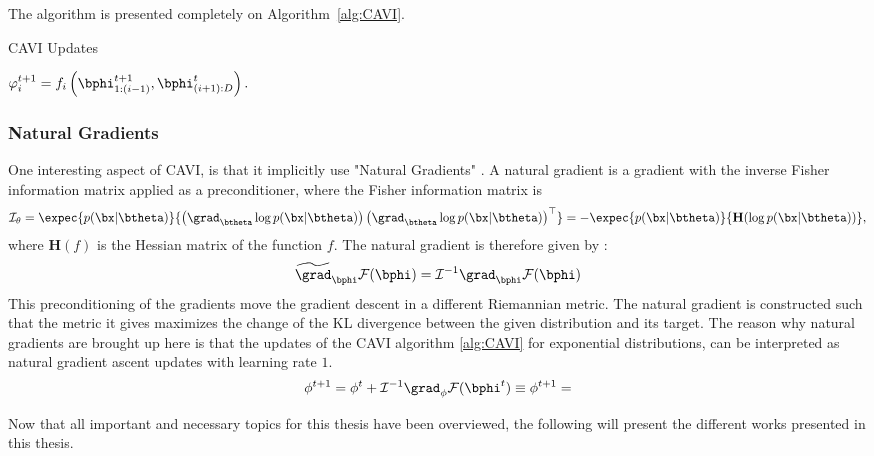 The algorithm is presented completely on Algorithm~\ref{alg:CAVI}.

\begin{algorithm}
    \caption{\ac{CAVI} Updates}
    \label{alg:CAVI}
    \begin{algorithmic}
                \State $\varphi_i^{t+1} = f_i\left(\bphi_{1:(i-1)}^{t+1}, \bphi_{(i+1):D}^t\right).$
            \EndFor
        \EndWhile
    \end{algorithmic}
\end{algorithm}


\subsubsection{Natural Gradients}

One interesting aspect of \ac{CAVI}, is that it implicitly use "Natural Gradients" \cite{amariNaturalGradientWorks1998}.
A natural gradient is a gradient with the inverse Fisher information matrix applied as a preconditioner, where the Fisher information matrix is
\begin{align}
    \mathcal{I}_\theta = \expec{p(\bx|\btheta)}{\left(\grad_{\btheta}\log p(\bx|\btheta)\right)\left(\grad_{\btheta} \log p(\bx|\btheta)\right)^\top} = -\expec{p(\bx|\btheta)}{\mathbf{H}(\log p(\bx|\btheta))},
    \label{eq:fisherinfomatrix}
\end{align}
where $\mathbf{H}(f)$ is the Hessian matrix of the function $f$.
The natural gradient is therefore given by :
\begin{align*}
    \widetilde{\grad}_{\bphi}\mathcal{F}(\bphi) = \mathcal{I}^{-1} \grad_{\bphi}\mathcal{F}(\bphi)
\end{align*}
This preconditioning of the gradients move the gradient descent in a different Riemannian metric.
The natural gradient is constructed such that the metric it gives maximizes the change of the \ac{KL} divergence between the given distribution and its target.
The reason why natural gradients are brought up here is that the updates of the \ac{CAVI} algorithm \ref{alg:CAVI} for exponential distributions, can be interpreted as natural gradient ascent updates with learning rate $1$.
\begin{align*}
    \phi^{t+1} = \phi^t + \mathcal{I}^{-1}\grad_{\phi}\mathcal{F}(\bphi^t) \equiv \phi^{t+1} = 
\end{align*}

Now that all important and necessary topics for this thesis have been overviewed, the following will present the different works presented in this thesis. 


